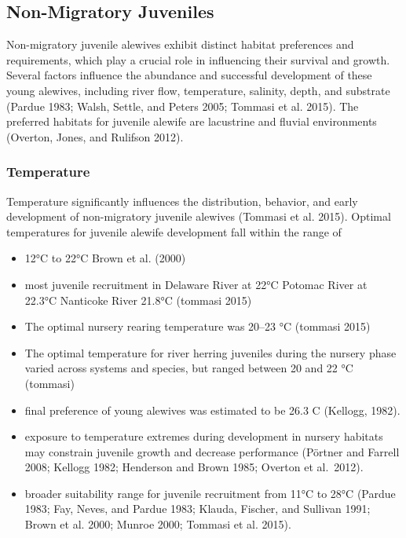 \documentclass[
]{book}
\begin{document}
\hypertarget{non-migratory-juveniles}{%
\subsection{Non-Migratory Juveniles}\label{non-migratory-juveniles}}

Non-migratory juvenile alewives exhibit distinct habitat preferences and requirements, which play a crucial role in influencing their survival and growth.
Several factors influence the abundance and successful development of these young alewives, including river flow, temperature, salinity, depth, and substrate (Pardue 1983; Walsh, Settle, and Peters 2005; Tommasi et al. 2015).
The preferred habitats for juvenile alewife are lacustrine and fluvial environments (Overton, Jones, and Rulifson 2012).

\hypertarget{temperature-1}{%
\subsubsection{Temperature}\label{temperature-1}}

Temperature significantly influences the distribution, behavior, and early development of non-migratory juvenile alewives (Tommasi et al. 2015).
Optimal temperatures for juvenile alewife development fall within the range of

\begin{itemize}
\item
  12°C to 22°C Brown et al. (2000)
\item
  most juvenile recruitment in Delaware River at 22°C Potomac River at 22.3°C Nanticoke River 21.8°C (tommasi 2015)
\item
  The optimal nursery rearing temperature was 20--23 °C (tommasi 2015)
\item
  The optimal temperature for river herring juveniles during the nursery phase varied across systems and species, but ranged between 20 and 22 °C (tommasi)
\item
  final preference of young alewives was estimated to be 26.3 C (Kellogg, 1982).
\item
  exposure to temperature extremes during development in nursery habitats may constrain juvenile growth and decrease performance (Pörtner and Farrell 2008; Kellogg 1982; Henderson and Brown 1985; Overton et al.~2012).
\item
  broader suitability range for juvenile recruitment from 11°C to 28°C (Pardue 1983; Fay, Neves, and Pardue 1983; Klauda, Fischer, and Sullivan 1991; Brown et al. 2000; Munroe 2000; Tommasi et al. 2015).
\end{itemize}
\end{document}
